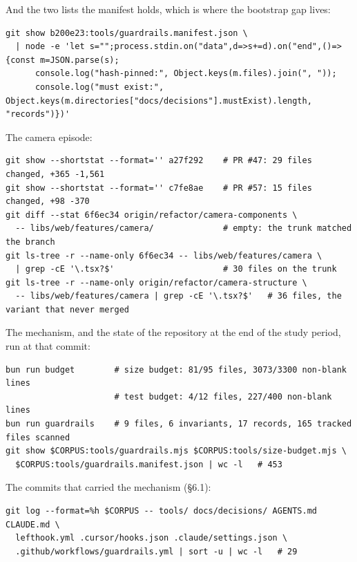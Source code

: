 \documentclass[11pt,a4paper]{article}
\begin{document}
And the two lists the manifest holds, which is where the bootstrap gap lives:

\begin{Verbatim}[fontsize=\footnotesize,breaklines=true,breakanywhere=true]
git show b200e23:tools/guardrails.manifest.json \
  | node -e 'let s="";process.stdin.on("data",d=>s+=d).on("end",()=>{const m=JSON.parse(s);
      console.log("hash-pinned:", Object.keys(m.files).join(", "));
      console.log("must exist:", Object.keys(m.directories["docs/decisions"].mustExist).length, "records")})'
\end{Verbatim}

The camera episode:

\begin{Verbatim}[fontsize=\footnotesize,breaklines=true,breakanywhere=true]
git show --shortstat --format='' a27f292    # PR #47: 29 files changed, +365 -1,561
git show --shortstat --format='' c7fe8ae    # PR #57: 15 files changed, +98 -370
git diff --stat 6f6ec34 origin/refactor/camera-components \
  -- libs/web/features/camera/              # empty: the trunk matched the branch
git ls-tree -r --name-only 6f6ec34 -- libs/web/features/camera \
  | grep -cE '\.tsx?$'                      # 30 files on the trunk
git ls-tree -r --name-only origin/refactor/camera-structure \
  -- libs/web/features/camera | grep -cE '\.tsx?$'   # 36 files, the variant that never merged
\end{Verbatim}

The mechanism, and the state of the repository at the end of the study period, run at that commit:

\begin{Verbatim}[fontsize=\footnotesize,breaklines=true,breakanywhere=true]
bun run budget        # size budget: 81/95 files, 3073/3300 non-blank lines
                      # test budget: 4/12 files, 227/400 non-blank lines
bun run guardrails    # 9 files, 6 invariants, 17 records, 165 tracked files scanned
git show $CORPUS:tools/guardrails.mjs $CORPUS:tools/size-budget.mjs \
  $CORPUS:tools/guardrails.manifest.json | wc -l   # 453
\end{Verbatim}

The commits that carried the mechanism (\S{}6.1):

\begin{Verbatim}[fontsize=\footnotesize,breaklines=true,breakanywhere=true]
git log --format=%h $CORPUS -- tools/ docs/decisions/ AGENTS.md CLAUDE.md \
  lefthook.yml .cursor/hooks.json .claude/settings.json \
  .github/workflows/guardrails.yml | sort -u | wc -l   # 29
\end{Verbatim}
\end{document}
